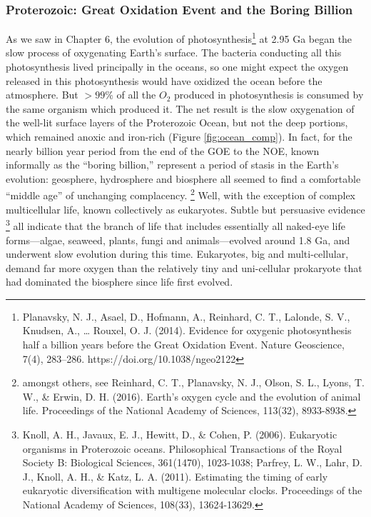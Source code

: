 \documentclass[amstex,12pt]{book}
\begin{document}
{\subsubsection{Proterozoic: Great Oxidation Event and the Boring Billion}
As we saw in Chapter 6, the evolution of photosynthesis\footnote{Planavsky, N. J., Asael, D., Hofmann, A., Reinhard, C. T., Lalonde, S. V., Knudsen, A., … Rouxel, O. J. (2014). Evidence for oxygenic photosynthesis half a billion years before the Great Oxidation Event. Nature Geoscience, 7(4), 283–286. https://doi.org/10.1038/ngeo2122} at 2.95 Ga began the slow process of oxygenating Earth's surface. The bacteria conducting all this photosynthesis lived principally in the oceans, so one might expect the oxygen released in this photosynthesis would have oxidized the ocean before the atmosphere. But $>99\%$ of all the $O_2$ produced in photosynthesis is consumed by the same organism which produced it. The net result is the slow oxygenation of the well-lit surface layers of the Proterozoic Ocean, but not the deep portions, which remained anoxic and iron-rich (Figure \ref{fig:ocean_comp}). In fact, for the nearly billion year period from the end of the GOE to the NOE, known informally as the ``boring billion,'' represent a period of stasis in the Earth's evolution: geosphere, hydrosphere and biosphere all seemed to find a comfortable ``middle age'' of unchanging complacency. \footnote{amongst others, see Reinhard, C. T., Planavsky, N. J., Olson, S. L., Lyons, T. W., \& Erwin, D. H. (2016). Earth’s oxygen cycle and the evolution of animal life. Proceedings of the National Academy of Sciences, 113(32), 8933-8938.} Well, with the exception of complex multicellular life, known collectively as eukaryotes. Subtle but persuasive evidence \footnote{Knoll, A. H., Javaux, E. J., Hewitt, D., \& Cohen, P. (2006). Eukaryotic organisms in Proterozoic oceans. Philosophical Transactions of the Royal Society B: Biological Sciences, 361(1470), 1023-1038; Parfrey, L. W., Lahr, D. J., Knoll, A. H., \& Katz, L. A. (2011). Estimating the timing of early eukaryotic diversification with multigene molecular clocks. Proceedings of the National Academy of Sciences, 108(33), 13624-13629.} all indicate that the branch of life that includes essentially all naked-eye life forms---algae, seaweed, plants, fungi and animals---evolved around 1.8 Ga, and underwent slow evolution during this time. Eukaryotes, big and multi-cellular, demand far more oxygen than the relatively tiny and uni-cellular prokaryote that had dominated the biosphere since life first evolved.    
}
\end{document}
